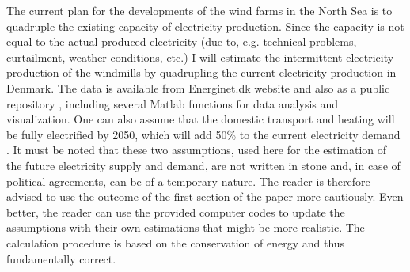 \documentclass{ECOS_2021}
\begin{document}
The current plan for the developments of the wind farms in the North Sea 
is to quadruple the existing capacity of electricity production. Since the
capacity is not equal to the actual produced electricity (due to,
e.g. technical problems, curtailment, weather conditions, etc.) I
will estimate the intermittent electricity production of the windmills
by quadrupling the current electricity production in Denmark. The data
is available from Energinet.dk website and also as a public
repository \cite{eftekhariSimulkadeStorageFirst2021}, including several
Matlab functions for data analysis and visualization. One can also assume that the 
domestic transport and heating will be fully electrified by 2050, which will add 50\% 
to the current electricity demand \cite{eftekhariQuantifyingRoleLiquid2020}. 
It must be noted that these two assumptions, used here for the estimation of the 
future electricity supply and demand, are not written in stone and, in case of political agreements, can be of 
a temporary nature. The reader is therefore advised to use the outcome of the first section of the 
paper more cautiously. Even better, the reader can use the provided computer codes to update 
the assumptions with their own estimations that might be more realistic. The calculation 
procedure is based on the conservation of energy and thus fundamentally correct. 
\end{document}
